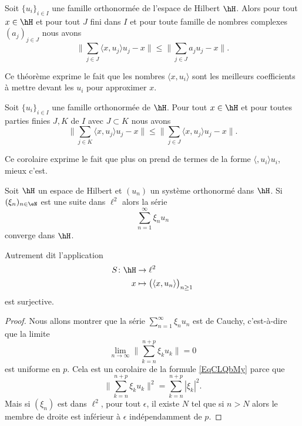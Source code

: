 \begin{theorem} \label{ThooRArDp}
	Soit \( \{ u_i \}_{i\in I}\) une famille orthonormée de l'espace de Hilbert \( \hH\). Alors pour tout \( x\in \hH\) et pour tout \( J\) fini dans \( I\) et pour toute famille de nombres complexes  \( (a_j)_{j\in J}\) nous avons
	\begin{equation}
		\| \sum_{j\in J}\langle x, u_j\rangle u_j-x \|\leq \| \sum_{j\in J}a_ju_j-x \|.
	\end{equation}
\end{theorem}
Ce théorème exprime le fait que les nombres \( \langle x, u_i\rangle \) sont les meilleurs coefficients à mettre devant les \( u_i\) pour approximer \( x\).

\begin{corollary}
	Soit \( \{ u_i \}_{i\in I}\) une famille orthonormée de \( \hH\). Pour tout \( x\in \hH\) et pour toutes parties finies \( J,K\) de \( I\) avec \( J\subset K\) nous avons
	\begin{equation}
		\| \sum_{j\in K}\langle x, u_j\rangle u_j-x \|\leq \| \sum_{j\in J}\langle x, u_j\rangle u_j-x \|.
	\end{equation}
\end{corollary}
Ce corolaire exprime le fait que plus on prend de termes de la forme \( \langle , u_i\rangle u_i\), mieux c'est.

\begin{proposition}     \label{PropzaKXHq}
	Soit \( \hH\) un espace de Hilbert et \( (u_n)\) un système orthonormé dans \( \hH\). Si \( (\xi_n)_{n\in \eN}\) est une suite dans \( \ell^2\) alors la série
	\begin{equation}
		\sum_{n=1}^{\infty}\xi_nu_n
	\end{equation}
	converge dans \( \hH\).

	Autrement dit l'application
	\begin{equation}
		\begin{aligned}
			S\colon \hH & \to \ell^2                                           \\
			x           & \mapsto \big( \langle x, u_n\rangle  \big)_{n\geq 1}
		\end{aligned}
	\end{equation}
	est surjective.
\end{proposition}

\begin{proof}
	Nous allons montrer que la série \( \sum_{n=1}^{\infty}\xi_nu_n\) est de Cauchy, c'est-à-dire que la limite
	\begin{equation}
		\lim_{n\to \infty} \big\| \sum_{k=n}^{n+p}\xi_ku_k \big\|=0
	\end{equation}
	est uniforme en \( p\). Cela est un corolaire de la formule \eqref{EqCLQbMy} parce que
	\begin{equation}
		\big\| \sum_{k=n}^{n+p}\xi_ku_k \big\|^2=\sum_{k=n}^{n+p}| \xi_k |^2.
	\end{equation}
	Mais si \( (\xi_n)\) est dans \( \ell^2\), pour tout \( \epsilon\), il existe \( N\) tel que si \( n>N\) alors le membre de droite est inférieur à \( \epsilon\) indépendamment de \( p\).
\end{proof}


